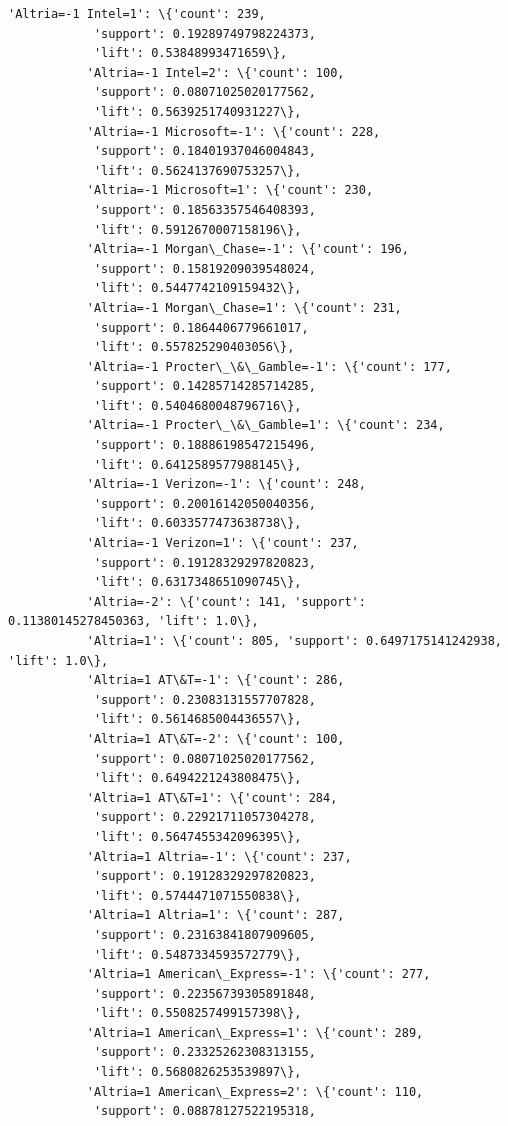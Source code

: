\documentclass[11pt]{article}
\begin{document}
\begin{Verbatim}[commandchars=\\\{\}]
           'Altria=-1 Intel=1': \{'count': 239,
            'support': 0.19289749798224373,
            'lift': 0.53848993471659\},
           'Altria=-1 Intel=2': \{'count': 100,
            'support': 0.08071025020177562,
            'lift': 0.5639251740931227\},
           'Altria=-1 Microsoft=-1': \{'count': 228,
            'support': 0.18401937046004843,
            'lift': 0.5624137690753257\},
           'Altria=-1 Microsoft=1': \{'count': 230,
            'support': 0.18563357546408393,
            'lift': 0.5912670007158196\},
           'Altria=-1 Morgan\_Chase=-1': \{'count': 196,
            'support': 0.15819209039548024,
            'lift': 0.5447742109159432\},
           'Altria=-1 Morgan\_Chase=1': \{'count': 231,
            'support': 0.1864406779661017,
            'lift': 0.557825290403056\},
           'Altria=-1 Procter\_\&\_Gamble=-1': \{'count': 177,
            'support': 0.14285714285714285,
            'lift': 0.5404680048796716\},
           'Altria=-1 Procter\_\&\_Gamble=1': \{'count': 234,
            'support': 0.18886198547215496,
            'lift': 0.6412589577988145\},
           'Altria=-1 Verizon=-1': \{'count': 248,
            'support': 0.20016142050040356,
            'lift': 0.6033577473638738\},
           'Altria=-1 Verizon=1': \{'count': 237,
            'support': 0.19128329297820823,
            'lift': 0.6317348651090745\},
           'Altria=-2': \{'count': 141, 'support': 0.11380145278450363, 'lift': 1.0\},
           'Altria=1': \{'count': 805, 'support': 0.6497175141242938, 'lift': 1.0\},
           'Altria=1 AT\&T=-1': \{'count': 286,
            'support': 0.23083131557707828,
            'lift': 0.5614685004436557\},
           'Altria=1 AT\&T=-2': \{'count': 100,
            'support': 0.08071025020177562,
            'lift': 0.6494221243808475\},
           'Altria=1 AT\&T=1': \{'count': 284,
            'support': 0.22921711057304278,
            'lift': 0.5647455342096395\},
           'Altria=1 Altria=-1': \{'count': 237,
            'support': 0.19128329297820823,
            'lift': 0.5744471071550838\},
           'Altria=1 Altria=1': \{'count': 287,
            'support': 0.23163841807909605,
            'lift': 0.5487334593572779\},
           'Altria=1 American\_Express=-1': \{'count': 277,
            'support': 0.22356739305891848,
            'lift': 0.5508257499157398\},
           'Altria=1 American\_Express=1': \{'count': 289,
            'support': 0.23325262308313155,
            'lift': 0.5680826253539897\},
           'Altria=1 American\_Express=2': \{'count': 110,
            'support': 0.08878127522195318,

\end{Verbatim}
\end{document}
